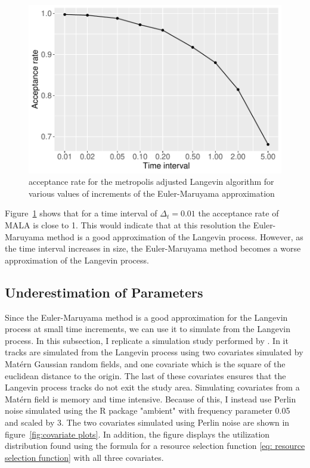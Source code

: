 \begin{figure}[H]
    \centering
    \includegraphics[width=\linewidth]{Images/example1/MALArates.pdf}
    \caption[MALA acceptance rates]{acceptance rate for the metropolis adjusted Langevin algorithm for various values of increments of the Euler-Maruyama approximation}
    \label{fig:MALA}
\end{figure}


Figure~\ref{fig:MALA} shows that for a time interval of $\Delta_t =0.01$ the acceptance rate of MALA is close to 1. This would indicate that at this resolution the Euler-Maruyama method is a good approximation of the Langevin process. However, as the time interval increases in size, the Euler-Maruyama method becomes a worse approximation of the Langevin process.


\subsection{Underestimation of Parameters}

Since the Euler-Maruyama method is a good approximation for the Langevin process at small time increments, we can use it to simulate from the Langevin process. In this subsection, I replicate a simulation study performed by \parencite{michelot_langevin_2019}. In it tracks are simulated from the Langevin process using two covariates simulated by Matérn Gaussian random fields, and one covariate which is the square of the euclidean distance to the origin. The last of these covariates ensures that the Langevin process tracks do not exit the study area. Simulating covariates from a Matérn field is memory and time intensive. Because of this, I instead use Perlin noise simulated using the R package "ambient" with frequency parameter 0.05 and scaled by 3. The two covariates simulated using Perlin noise are shown in figure~\ref{fig:covariate plots}. In addition, the figure displays the utilization distribution found using the formula for a resource selection function \eqref{eq: resource selection function} with all three covariates.



